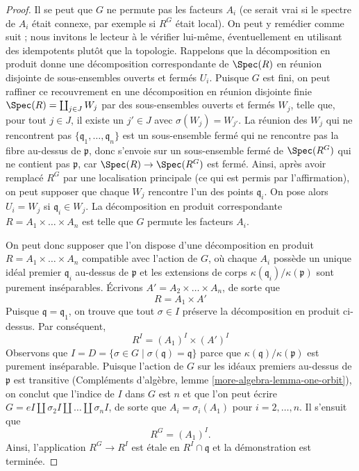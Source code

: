 \begin{proof}
\medskip\noindent
Il se peut que $G$ ne permute pas les facteurs $A_i$
(ce serait vrai si le spectre de $A_i$ était connexe,
par exemple si $R^G$ était local). On peut y remédier comme suit ;
nous invitons le lecteur à le vérifier lui-même, éventuellement
en utilisant des idempotents plutôt que la topologie.
Rappelons que la décomposition en produit donne une décomposition correspondante
de $\Spec(R)$ en réunion disjointe de sous-ensembles ouverts et fermés
$U_i$. Puisque $G$ est fini, on peut raffiner ce recouvrement
en une décomposition en réunion disjointe finie
$\Spec(R) = \coprod_{j \in J} W_j$ par des sous-ensembles ouverts
et fermés $W_j$, telle que, pour tout $j \in J$, il existe
un $j' \in J$ avec $\sigma(W_j) = W_{j'}$. La réunion des
$W_j$ qui ne rencontrent pas $\{\mathfrak q_1, \ldots, \mathfrak q_n\}$
est un sous-ensemble fermé qui ne rencontre pas la fibre au-dessus de $\mathfrak p$,
donc s'envoie sur un sous-ensemble fermé de $\Spec(R^G)$ qui ne contient pas
$\mathfrak p$, car $\Spec(R) \to \Spec(R^G)$ est fermé.
Ainsi, après avoir remplacé $R^G$ par une localisation principale
(ce qui est permis par l'affirmation), on peut supposer que chaque $W_j$ rencontre
l'un des points $\mathfrak q_i$. On pose alors $U_i = W_j$
si $\mathfrak q_i \in W_j$. La décomposition en produit correspondante
$R = A_1 \times \ldots \times A_n$ est telle
que $G$ permute les facteurs $A_i$.

\medskip\noindent
On peut donc supposer que l'on dispose d'une décomposition en produit
$R = A_1 \times \ldots \times A_n$ compatible avec l'action de $G$,
où chaque $A_i$ possède un unique idéal premier $\mathfrak q_i$ au-dessus
de $\mathfrak p$ et les extensions de corps
$\kappa(\mathfrak q_i)/\kappa(\mathfrak p)$ sont purement inséparables.
Écrivons $A' = A_2 \times \ldots \times A_n$, de sorte que
$$
R = A_1 \times A'
$$
Puisque $\mathfrak q = \mathfrak q_1$, on trouve que tout
$\sigma \in I$ préserve la décomposition en produit ci-dessus.
Par conséquent,
$$
R^I = (A_1)^I \times (A')^I
$$
Observons que $I = D = \{\sigma \in G \mid \sigma(\mathfrak q) = \mathfrak q\}$
parce que $\kappa(\mathfrak q)/\kappa(\mathfrak p)$ est purement inséparable.
Puisque l'action de $G$ sur les idéaux premiers au-dessus de $\mathfrak p$ est transitive
(Compléments d'algèbre, lemme \ref{more-algebra-lemma-one-orbit}),
on conclut que l'indice de $I$ dans $G$ est $n$ et que l'on peut écrire
$G = eI \amalg \sigma_2I \amalg \ldots \amalg \sigma_nI$, de sorte que
$A_i = \sigma_i(A_1)$ pour $i = 2, \ldots, n$. Il s'ensuit que
$$
R^G = (A_1)^I.
$$
Ainsi, l'application $R^G \to R^I$ est étale en $R^I \cap \mathfrak q$
et la démonstration est terminée.
\end{proof}

